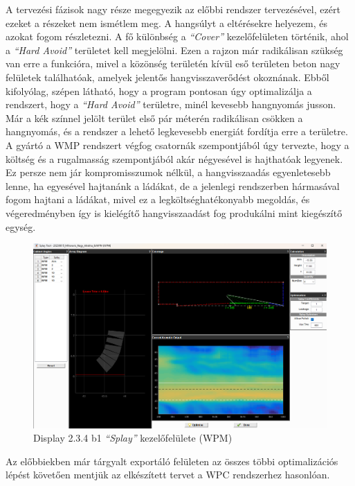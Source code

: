 A tervezési fázisok nagy része megegyezik az előbbi rendszer tervezésével, ezért ezeket a részeket nem ismétlem meg.
A hangsúlyt a eltérésekre helyezem, és azokat fogom részletezni.
A fő különbség a \textit{``Cover''} kezelőfelületen történik, ahol a \textit{``Hard Avoid''} területet kell megjelölni.
Ezen a rajzon már radikálisan szükség van erre a funkcióra, mivel a közönség területén kívül eső területen beton nagy felületek találhatóak,
amelyek jelentős hangvisszaverődést okoznának. 
Ebből kifolyólag, szépen látható, hogy a program pontosan úgy optimalizálja a rendszert, hogy a \textit{``Hard Avoid''} területre, minél kevesebb
hangnyomás jusson.
Már a kék színnel jelölt terület első pár méterén radikálisan csökken a hangnyomás, és a rendszer a lehető legkevesebb energiát fordítja erre a területre.
A gyártó a WMP rendszert végfog csatornák szempontjából úgy tervezte, hogy a költség és a rugalmasság szempontjából akár négyesével is hajthatóak legyenek.
Ez persze nem jár kompromisszumok nélkül, a hangvisszaadás egyenletesebb lenne, ha egyesével hajtanánk a ládákat, de a jelenlegi rendszerben
hármasával fogom hajtani a ládákat, mivel ez a legköltséghatékonyabb megoldás, és végeredményben így is kielégítő hangvisszaadást fog produkálni mint 
kiegészítő egység.
\begin{figure}[H]
	\centering
	\includegraphics[width=\textwidth, keepaspectratio]{figures/display_wpm_2.png}
	\caption{Display 2.3.4 b1 \textit{``Splay''} kezelőfelülete (WPM)}\label{fig:display_wpm_2}
\end{figure}
Az előbbiekben már tárgyalt exportáló felületen az összes többi optimalizációs lépést követően
mentjük az elkészített tervet a WPC rendszerhez hasonlóan.
